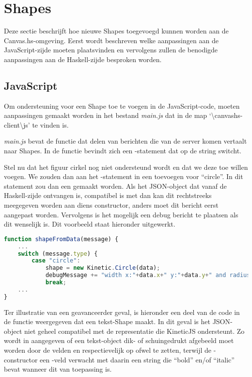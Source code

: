 \section{Shapes} \label{sec:shapesext}
Deze sectie beschrijft hoe nieuwe Shapes toegevoegd kunnen worden aan de Canvas.hs-omgeving. Eerst wordt beschreven welke aanpassingen aan de JavaScript-zijde moeten plaatsvinden en vervolgens zullen de benodigde aanpassingen aan de Haskell-zijde besproken worden.

\subsection{JavaScript}
Om ondersteuning voor een Shape toe te voegen in de JavaScript-code, moeten aanpassingen gemaakt worden in het bestand \emph{main.js} dat in de map `\textbackslash canvashs-client\textbackslash js' te vinden is.

\emph{main.js} bevat de functie  dat delen van berichten die van de server komen vertaalt naar Shapes. In de  functie bevindt zich een -statement dat op de string  switcht.

Stel nu dat het figuur cirkel nog niet ondersteund wordt en dat we deze toe willen voegen. We zouden dan aan het -statement in  een  toevoegen voor ``circle''. In dit  statement zou dan een  gemaakt worden. Als het JSON-object  dat vanaf de Haskell-zijde ontvangen is, compatibel is met  dan kan dit rechtstreeks meegegeven worden aan diens constructor, anders moet dit bericht eerst aangepast worden. Vervolgens is het mogelijk een debug bericht te plaatsen als dit wenselijk is. Dit voorbeeld staat hieronder uitgewerkt.

\begin{lstlisting}[language=JavaScript]
function shapeFromData(message) {
	...
	switch (message.type) {
		case "circle":
			shape = new Kinetic.Circle(data);
			debugMessage += "width x:"+data.x+" y:"+data.y+" and radius:"+data.radius;
			break;
	...
}
\end{lstlisting}

Ter illustratie van een geavanceerder geval, is hieronder een deel van de code in de  functie weergegeven dat een tekst-Shape maakt. In dit geval is het  JSON-object niet geheel compatibel met de representatie die KineticJS ondersteunt. Zo wordt in  aangegeven of een tekst-object dik- of schuingedrukt afgebeeld moet worden door de velden  en respectievelijk  op  ofwel  te zetten, terwijl de -constructor een -veld verwacht met daarin een string die ``bold'' en/of ``italic'' bevat wanneer dit van toepassing is.


